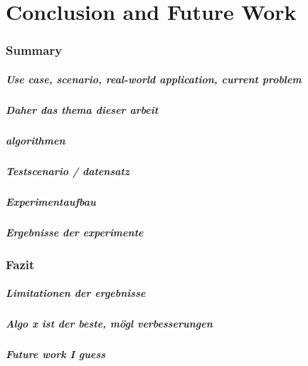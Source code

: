 \documentclass[main.tex]{subfiles}
\begin{document}
\chapter{Conclusion and Future Work}
\subsection*{Summary}

\paragraph*{Use case, scenario, real-world application, current problem}

\paragraph*{Daher das thema dieser arbeit}

\paragraph*{algorithmen}

\paragraph*{Testscenario / datensatz}

\paragraph*{Experimentaufbau}

\paragraph*{Ergebnisse der experimente }


\subsection*{Fazit}

\paragraph*{Limitationen der ergebnisse}

\paragraph*{Algo x ist der beste, mögl verbesserungen}

\paragraph*{Future work I guess}
\end{document}
